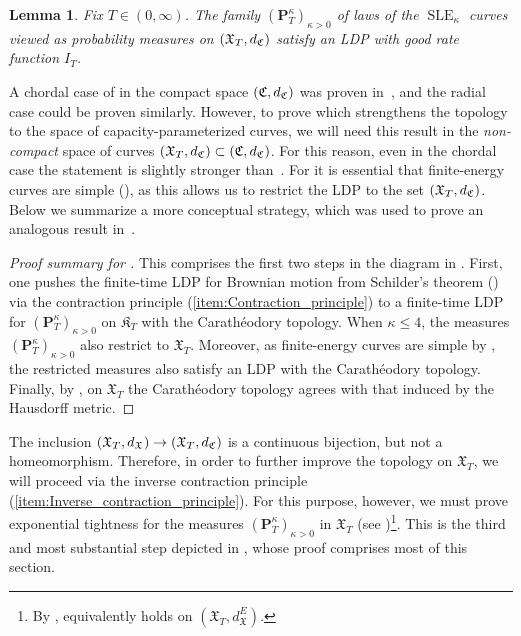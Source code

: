 \documentclass[a4paper, 11pt]{article}
\newtheorem{lem}[thm]{Lemma}
\theoremstyle{definition}
\numberwithin{equation}{section}
\numberwithin{figure}{section}
\newcommand{\SLE}[1][]{\operatorname{SLE}_{#1}}
\newcommand{\Xlenergy}[1][]{I_{#1}}
\newcommand{\Khulls}[1][]{\mathfrak{K}_{#1}}
\newcommand{\Xpaths}[1][]{\mathfrak{X}_{#1}}
\newcommand{\dCcompsets}{d_{\Ccompsets}}
\newcommand{\dXpaths}[1][]{d_{\Xpaths[#1]}}
\newcommand{\dXpathsEucl}{d_{\Xpaths[]}^E}
\newcommand{\Xmeasure}[2][]{\mathbf{P}^{#2}_{\!#1}}
\begin{document}
\begin{lem}\label{thm:LDP-compact}
Fix $T \in (0,\infty)$. 
The family $(\Xmeasure[T]{\kappa})_{\kappa > 0}$ of laws of the $\SLE[\kappa]$ curves viewed as probability measures on 
$(\Xpaths[T],\dCcompsets)$ 
satisfy an LDP with good rate function $\Xlenergy[T]$. 
\end{lem}

A chordal case of  in the compact space $(\Ccompsets,\dCcompsets)$ was proven in~\cite[Proposition~5.3]{Peltola-Wang:LDP}, and the radial case could be proven similarly. 
However, to prove 
which strengthens the topology to the space of capacity-parameterized curves, 
we will need this result in the \emph{non-compact} space of curves $(\Xpaths[T],\dCcompsets) \subset (\Ccompsets,\dCcompsets)$.
For this reason, even in the chordal case the statement is slightly stronger than~\cite[Proposition~5.3]{Peltola-Wang:LDP}. 
For  it is essential that finite-energy curves are simple (), as this allows us to restrict the LDP to the set $(\Xpaths[T], \dCcompsets)$.
Below we summarize a more conceptual strategy, which was used to prove an analogous result in~\cite[Theorem~1.8]{AHP:Large_deviations_of_DBM_and_multiradial_SLE}.


\begin{proof}[Proof summary for ]
This comprises the first two steps in the diagram in . 
First, one pushes the finite-time LDP for Brownian motion from Schilder's theorem () 
via the contraction principle (\ref{item:Contraction_principle})
to a finite-time LDP for $(\Xmeasure[T]{\kappa})_{\kappa > 0}$ on $\Khulls[T]$ with the Carath\'eodory topology. 
When $\kappa \le 4$, the measures $(\Xmeasure[T]{\kappa})_{\kappa > 0}$ also restrict to $\Xpaths[T]$.
Moreover, as finite-energy curves are simple by , 
the restricted measures also satisfy an LDP with the Carath\'eodory topology. 
Finally, by , on $\Xpaths[T]$ the Carath\'eodory topology agrees with that induced by the Hausdorff metric.
\end{proof}


The inclusion $(\Xpaths[T],\dXpaths) \to (\Xpaths[T],\dCcompsets)$ is a continuous bijection, but not a homeomorphism. 
Therefore, in order to further improve the topology on $\Xpaths[T]$, 
we will proceed via the inverse contraction principle (\ref{item:Inverse_contraction_principle}).
For this purpose, however, we must prove exponential tightness 
for the measures $(\Xmeasure[T]{\kappa})_{\kappa > 0}$ in $\Xpaths[T]$ 
(see )\footnote{By , 
 equivalently holds on $(\Xpaths[T],\dXpathsEucl)$.}.
This is the third and most substantial step depicted in , 
whose proof comprises most of this section. 
\end{document}
